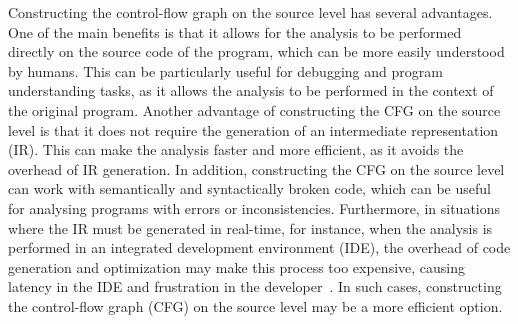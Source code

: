 Constructing the control-flow graph on the source level has several advantages.
One of the main benefits is that it allows for the analysis to be performed directly
on the source code of the program, which can be more easily understood by humans.
This can be particularly useful for debugging and program understanding tasks,
as it allows the analysis to be performed in the context of the original program.
Another advantage of constructing the CFG on the source level is that it does not
require the generation of an intermediate representation (IR). This can make the
analysis faster and more efficient, as it avoids the overhead of IR generation.
In addition, constructing the CFG on the source level can work with semantically
and syntactically broken code, which can be useful for analysing programs with
errors or inconsistencies.
Furthermore, in situations where the IR must be generated in real-time,
for instance, when the analysis is performed in an integrated development environment (IDE),
the overhead of code generation and optimization may make this process too expensive,
causing latency in the IDE and frustration in the developer~\cite{piskachev2022far}.
In such cases, constructing the control-flow graph (CFG) on the source level
may be a more efficient option.

